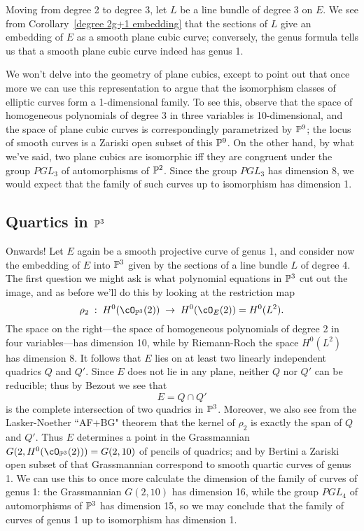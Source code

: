 Moving from degree 2 to degree 3, let $L$ be a line bundle of degree 3 on $E$. We see from Corollary~\ref{degree 2g+1 embedding} that the sections of $L$ give an embedding of $E$ as a smooth plane cubic curve; conversely, the genus formula tells us that a smooth plane cubic curve indeed has genus 1. 

We won't delve into the geometry of plane cubics, except to point out that once more we can use this representation to argue that the isomorphism classes of elliptic curves form a 1-dimensional family. To see this, observe that the space of homogeneous polynomials of degree 3 in three variables is 10-dimensional, and the space of plane cubic curves is correspondingly parametrized by  $\PP^9$; the locus of smooth curves is a Zariski open subset of this $\PP^9$. On the other hand, by what we've said, two plane cubics are isomorphic iff they are congruent under the group $PGL_3$ of automorphisms of $\PP^2$. Since the group $PGL_3$ has dimension 8, we would expect that the family of such curves up to isomorphism has dimension 1.

\subsection{Quartics in $\PP^3$} 

Onwards! Let $E$ again be a smooth projective curve of genus 1, and consider now the embedding of $E$ into $\PP^3$ given by the sections of a line bundle $L$ of degree 4. The first question we might ask is what polynomial equations in $\PP^3$ cut out the image, and as before we'll do this by looking at the restriction map
$$
\rho_2 \;  : \; H^0(\cO_{\PP^3}(2)) \; \to \; H^0(\cO_{E}(2)) = H^0(L^2).
$$
The space on the right---the space of homogeneous polynomials of degree 2 in four variables---has dimension 10, while by Riemann-Roch the space $H^0(L^2)$ has dimension 8. It follows that $E$ lies on at least two linearly independent quadrics $Q$ and $Q'$. Since $E$ does not lie in any plane, neither $Q$ nor $Q'$ can be reducible; thus by Bezout we see that
$$
E = Q \cap Q'
$$
is the complete intersection of two quadrics in $\PP^3$. Moreover, we also see from the Lasker-Noether ``AF+BG" theorem that the kernel of $\rho_2$ is exactly the span of $Q$ and $Q'$. Thus $E$ determines a point in the Grassmannian $G(2, H^0(\cO_{\PP^3}(2))) = G(2, 10)$ of pencils of quadrics; and by Bertini a Zariski open subset of that Grassmannian correspond to smooth quartic curves of genus 1. We can use this to once more calculate the dimension of the family of curves of genus 1: the Grassmannian $G(2,10)$ has dimension 16, while the group $PGL_4$ of automorphisms of $\PP^3$ has dimension 15, so we may conclude that the family of curves of genus 1 up to isomorphism has dimension 1.


